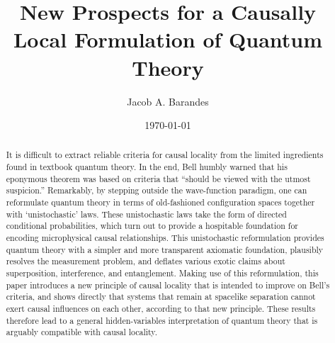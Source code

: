 \documentclass[12pt,english,prl,superscriptaddress,nobibnotes,nofootinbib]{revtex4-2}
\begin{document}
\title{New Prospects for a Causally Local Formulation of Quantum Theory}
\author{Jacob A. Barandes}

\date{\today}
\begin{abstract}
It is difficult to extract reliable criteria for causal locality
from the limited ingredients  found in textbook quantum theory.
In the end, Bell humbly warned that his eponymous theorem was based
on criteria that ``should be viewed with the utmost suspicion.''
Remarkably, by stepping outside the wave-function paradigm, one can
reformulate quantum theory in terms of old-fashioned configuration
spaces together with \textquoteleft unistochastic\textquoteright{}
 laws. These unistochastic laws take the form of directed conditional
probabilities, which turn out to provide a hospitable foundation for
encoding microphysical causal relationships. This unistochastic reformulation
provides quantum theory with a simpler and more transparent axiomatic
 foundation, plausibly resolves the measurement problem, and deflates
various exotic claims about superposition, interference, and entanglement.
Making use of this reformulation, this paper introduces a new principle
of causal locality that is intended to improve on Bell's criteria,
and shows directly that systems that remain at spacelike separation
cannot exert causal influences on each other, according to that new
principle. These results therefore lead to a general hidden-variables
interpretation of quantum theory that is arguably compatible with
causal locality.
\end{abstract}
\maketitle
\newpage
\end{document}
